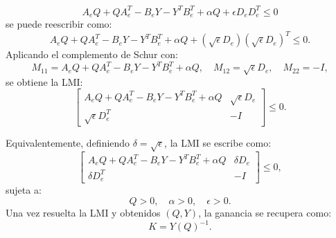 \begin{itemize}
\begin{equation*}
    A_e Q + Q A_e^T - B_e Y - Y^T B_e^T + \alpha Q + \epsilon D_e D_e^T \leq 0
\end{equation*}
se puede reescribir como:
\begin{equation*}
    A_e Q + Q A_e^T - B_e Y - Y^T B_e^T + \alpha Q + (\sqrt{\epsilon} D_e) (\sqrt{\epsilon} D_e)^T \leq 0.
\end{equation*}
Aplicando el complemento de Schur con:
\begin{equation*}
    M_{11} = A_e Q + Q A_e^T - B_e Y - Y^T B_e^T + \alpha Q, \quad
    M_{12} = \sqrt{\epsilon} D_e, \quad
    M_{22} = -I,
\end{equation*}
se obtiene la LMI:
\begin{equation*}
    \begin{bmatrix}
        A_e Q + Q A_e^T - B_e Y - Y^T B_e^T + \alpha Q & \sqrt{\epsilon} D_e \\
        \sqrt{\epsilon} D_e^T & -I
    \end{bmatrix} \leq 0.
\end{equation*}

Equivalentemente, definiendo \(\delta = \sqrt{\epsilon}\), la LMI se escribe como:
\begin{equation*}
    \begin{bmatrix}
        A_e Q + Q A_e^T - B_e Y - Y^T B_e^T + \alpha Q & \delta D_e \\
        \delta D_e^T & -I
    \end{bmatrix} \leq 0,
\end{equation*}
sujeta a:
\begin{equation*}
    Q > 0, \quad \alpha > 0, \quad \epsilon > 0.
\end{equation*}
Una vez resuelta la LMI y obtenidos \((Q, Y)\), la ganancia se recupera como:
\begin{equation*}
    K = Y (Q)^{-1}.
\end{equation*}


\end{itemize}
